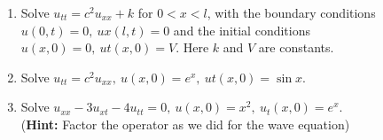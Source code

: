 \documentclass[11pt,a4paper]{article}
\begin{document}
\begin{enumerate}
		(B) What is the equilibrium state (the term that does not tend to zero as $t \to \infty$?
		\item Solve $u_{tt} = c^2 u_{xx} + k$ for $0 < x < l$, with the boundary conditions $u(0, t) = 0,\ ux(l, t) = 0$ and the initial conditions $u(x, 0) = 0,\ ut(x, 0) = V$. Here $k$ and $V$ are constants.
		\item Solve $u_{tt} = c^2 u_{xx},\ u(x, 0) = e^x,\ ut(x, 0) = \sin x$.
		\item Solve $u_{xx} - 3u_{xt} - 4u_{tt} = 0,\ u(x, 0) = x^2,\ u_t(x, 0) = e^x$.\\
		(\textbf{Hint:} Factor the operator as we did for the wave equation)
	\end{enumerate}
\end{document}
